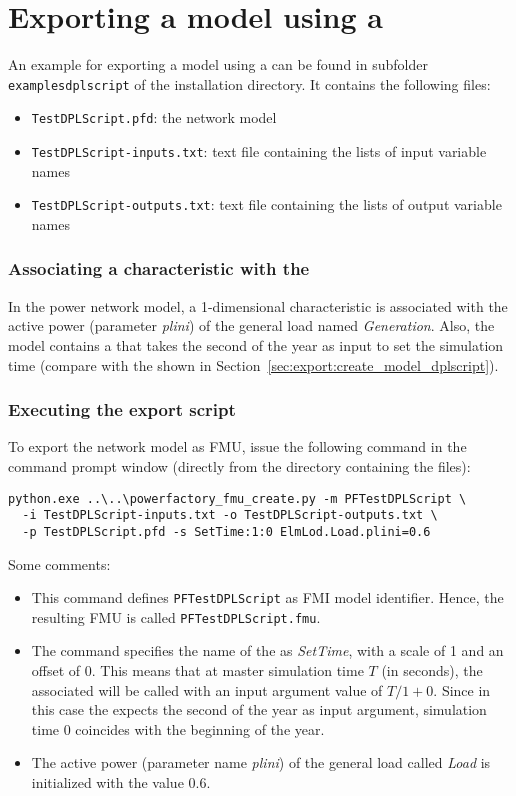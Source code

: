 \newpage

\section{Exporting a model using a \dplscript}
\label{sec:examples:dplscript}

An example for exporting a model using a \dplscript can be found in subfolder  \texttt{examplesdplscript} of the installation directory.
It contains the following files:
\begin{itemize}
  \item \texttt{TestDPLScript.pfd}: the \pf network model
  \item \texttt{TestDPLScript-inputs.txt}: text file containing the lists of input variable names
  \item \texttt{TestDPLScript-outputs.txt}: text file containing the lists of output variable names
\end{itemize}

\subsubsection*{Associating a characteristic with the \dplscript}

In the power network model, a 1-dimensional characteristic is associated with the active power (parameter \emph{plini}) of the general load named \emph{Generation}.
Also, the \pf model contains a \dplscript that takes the second of the year as input to set the simulation time (compare with the \dplscript shown in Section~\ref{sec:export:create_model_dplscript}).

\subsubsection*{Executing the export script}

To export the network model as FMU, issue the following command in the command prompt window (directly from the directory  containing the files):
\begin{verbatim}
python.exe ..\..\powerfactory_fmu_create.py -m PFTestDPLScript \
  -i TestDPLScript-inputs.txt -o TestDPLScript-outputs.txt \
  -p TestDPLScript.pfd -s SetTime:1:0 ElmLod.Load.plini=0.6
\end{verbatim}
Some comments:
\begin{itemize}
  \item This command defines \texttt{PFTestDPLScript} as FMI model identifier.
  Hence, the resulting FMU is called \texttt{PFTestDPLScript.fmu}.
  \item The command specifies the name of the \dplscript as \emph{SetTime}, with a scale of 1 and an offset of 0.
  This means that at master simulation time $T$ (in seconds), the associated \dplscript will be called with an input argument value of $T/1 + 0$.
  Since in this case the \dplscript expects the second of the year as input argument, simulation time 0 coincides with the beginning of the year.
  \item The active power (parameter name \emph{plini}) of the general load called \emph{Load} is initialized with the value $0.6$.
\end{itemize}


